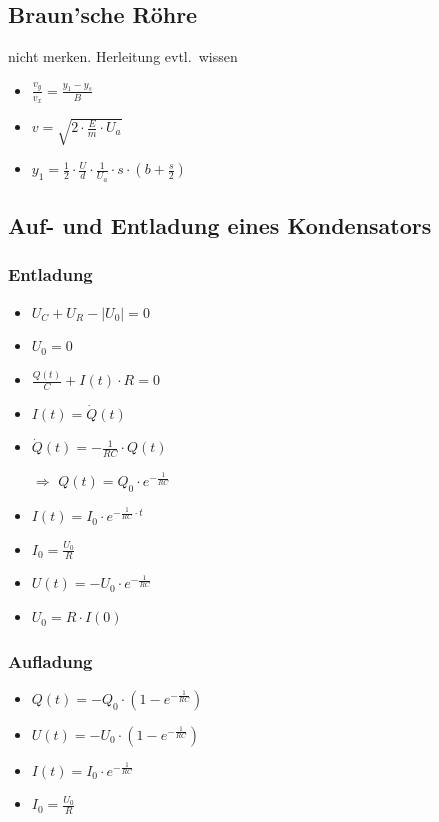 \documentclass[paper = a4, twocolumn]{scrartcl}
\begin{document}
\subsection{Braun’sche Röhre}

nicht merken. Herleitung evtl.\ wissen
\begin{itemize}
\item
	\( \frac{v_y}{v_x} = \frac{y_1 - y_s}{B} \)
\item
	\( v = \sqrt{2 \cdot \frac{E}{m} \cdot U_a} \)
\item
	\( y_1 = \frac{1}{2} \cdot \frac{U}{d} \cdot \frac{1}{U_a} \cdot s \cdot (b
	+ \frac{s}{2} ) \)
\end{itemize}

\subsection{Auf-  und Entladung eines Kondensators}
\subsubsection{Entladung}
\begin{itemize}
\item
	\( U_C + U_R - |U_0| = 0 \)
\item
	\( U_0 = 0 \)
\item
	\( \frac{Q(t)}{C} + I(t) \cdot R = 0 \)
\item
	\( I(t) = \dot{Q}(t) \)
\item
	\( \dot{Q}(t) = -\frac{1}{RC} \cdot Q(t) \)
\item[\(\Rightarrow\)]
	\( Q(t) = Q_0 \cdot e^{-\frac{1}{RC}} \)
\item
	\( I(t) = I_0 \cdot e^{-\frac{1}{RC} \cdot t} \)
\item
	\( I_0 = \frac{U_0}{R} \)
\item
	\( U(t) = -U_0 \cdot e^{-\frac{1}{RC}} \)
\item
	\( U_0 = R \cdot I(0) \)
\end{itemize}

\subsubsection{Aufladung}
\begin{itemize}
\item
	\( Q(t) = -Q_0 \cdot (1 - e^{-\frac{1}{RC}}) \)
\item
	\( U(t) = -U_0 \cdot (1 - e^{-\frac{1}{RC}}) \)
\item
	\( I(t) = I_0 \cdot  e^{-\frac{1}{RC}} \)
\item
	\( I_0 = \frac{U_0}{R} \)
\end{itemize}
\end{document}
